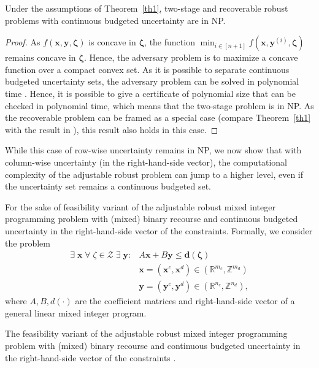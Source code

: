 \documentclass[a4paper,abstracton]{scrartcl}
\begin{document}
\begin{cor}\label{cor4}
Under the assumptions of Theorem~\ref{th1}, two-stage and recoverable robust problems with continuous budgeted uncertainty are in NP.
\end{cor}
\begin{proof}
As $f(\pmb{x},\pmb{y},\pmb{\zeta})$ is concave in $\pmb{\zeta}$, the function $\min_{i\in[n+1]} f(\pmb{x},\pmb{y}^{(i)},\pmb{\zeta})$ remains concave in $\pmb{\zeta}$. Hence, the adversary problem is to maximize a concave function over a compact convex set. As it is possible to separate continuous budgeted uncertainty sets, the adversary problem can be solved in polynomial time \cite{grotschel1981ellipsoid}. Hence, it is possible to give a certificate of polynomial size that can be checked in polynomial time, which means that the two-stage problem is in NP. As the recoverable problem can be framed as a special case (compare Theorem~\ref{th1} with the result in \cite{bold2020}), this result also holds in this case.
\end{proof}


While this case of row-wise uncertainty remains in NP, we now show that 
with column-wise uncertainty (in the right-hand-side vector), 
the computational complexity of the adjustable robust problem can jump to a higher level, 
even if the uncertainty set remains a continuous budgeted set.

For the sake of  feasibility variant of the adjustable robust mixed integer programming problem with (mixed) binary recourse
and continuous budgeted uncertainty in the right-hand-side vector of the constraints.
Formally, we consider the problem
\begin{align*}
\exists\;\pmb{x}\; \forall\;\zeta \in \mathcal{Z}\; \exists\;\pmb{y} \colon & A\pmb{x} + B\pmb{y} \leq \pmb{d}(\pmb{\zeta})\\
& \pmb{x} = (\pmb{x}^c, \pmb{x}^d) \in (\mathbb{R}^{m_c}, \mathbb{Z}^{m_d})\\
& \pmb{y} = (\pmb{y}^c, \pmb{y}^d) \in (\mathbb{R}^{n_c}, \mathbb{Z}^{n_d}),
\end{align*}
where $A, B, d(\cdot)$ are the coefficient matrices and right-hand-side vector
of a general linear mixed integer program.

\begin{theorem}
\label{thm:mixed-binary-recourse}
The feasibility variant of the adjustable robust mixed integer programming problem with (mixed) binary recourse and continuous budgeted uncertainty in the right-hand-side vector of the constraints .
\end{theorem}
\end{document}
